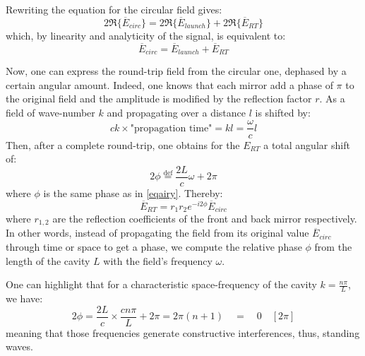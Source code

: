 \documentclass[11pt]{report}
\begin{document}
Rewriting the equation for the circular field gives:
\begin{equation}
2\Re\{\overline{E}_{circ}\} = 2\Re\{\overline{E}_{launch}\} + 2\Re\{\overline{E}_{RT}\}
\end{equation}
which, by linearity and analyticity of the signal, is equivalent to:
\begin{equation}
\label{eqecirc}
\overline{E}_{circ} = \overline{E}_{launch} + \overline{E}_{RT}
\end{equation}

Now, one can express the round-trip field from the circular one, dephased by a certain angular amount. Indeed, one knows that each mirror add a phase of $\pi$ to the original field and the amplitude is modified by the reflection factor $r$. As a field of wave-number $k$ and propagating over a distance $l$ is shifted by:
\begin{equation}
ck \times \textrm{"propagation time"} = kl = \frac{\omega}{c}l
\end{equation} 
Then, after a complete round-trip, one obtains for the $E_{RT}$ a total angular shift of:
\begin{equation}
2\phi \stackrel{\text{def}}{=} \frac{2L}{c}\omega + 2\pi
\end{equation} 
where $\phi$ is the same phase as in \eqref{eqairy}. Thereby:
\begin{equation}
\label{eqrt}
\overline{E}_{RT} = r_1 r_2 e^{-i2\phi} \overline{E}_{circ}
\end{equation}
where $r_{1,2}$ are the reflection coefficients of the front and back mirror respectively. In other words, instead of propagating the field from its original value $ \overline{E}_{circ}$ through time or space to get a phase, we compute the relative phase $\phi$ from the length of the cavity $L$ with the field's frequency $\omega$.

One can highlight that for a characteristic space-frequency of the cavity $k=\frac{n\pi}{L}$, we have:
\begin{equation}
\label{phimodif}
2\phi = \frac{2L}{c} \times \frac{cn\pi}{L} + 2\pi = 2\pi(n + 1) \quad = \quad 0 \quad [2\pi]
\end{equation}
meaning that those frequencies generate constructive interferences, thus, standing waves.
\end{document}
